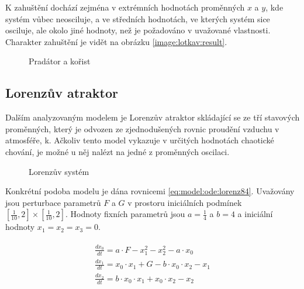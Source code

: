 K zahuštění dochází zejména v extrémních hodnotách pro\-měn\-ných $x$ a $y$, kde systém vůbec neosciluje,
a ve středních hodnotách, ve kterých systém sice osciluje, ale okolo jiné hodnoty, než je požadováno v uvažované vlastnosti.
Charakter zahuštění je vidět na obrázku \ref{image:lotkav:result}. 

\begin{figure}[h!]
\begin{center}
\caption{Pradátor a kořist}
\end{center}
\end{figure}


\subsection{Lorenzův atraktor}

Dalším analyzovaným modelem je Lorenzův atraktor \cite{lorenz2010} skládající se
ze tří stavových proměnných, který je odvozen ze zjednodušených rovnic prou\-dě\-ní
vzduchu v atmosféře, k. Ačkoliv tento model vykazuje v určitých hodnotách chaotické chování,
je možné u něj nalézt na jedné z proměnných oscilaci.

\begin{figure}[h!]
\begin{center}
\caption{Lorenzův systém}
\end{center}
\end{figure}

Konkrétní podoba modelu je dána rovnicemi \ref{eq:model:ode:lorenz84}. Uvažovány jsou perturbace
parametrů $F$ a $G$ v prostoru iniciálních podmínek $[\frac{1}{10}, 2] \times [\frac{1}{10}, 2]$.
Hodnoty fixních parametrů jsou $a = \frac{1}{4}$ a $b = 4$ a iniciální hodnoty $x_1 = x_2 = x_3 = 0$.

\begin{align}\label{eq:model:ode:lorenz84}
\begin{array}{ll}
\frac{dx_0}{dt} = a \cdot F - x_1^2 - x_2^2 - a \cdot x_0				\\
\frac{dx_1}{dt} = x_0 \cdot x_1 + G - b \cdot x_0 \cdot x_2 - x_1			\\
\frac{dx_2}{dt} = b \cdot x_0 \cdot x_1 + x_0 \cdot x_2 - x_2				\\
\end{array}
\end{align}

